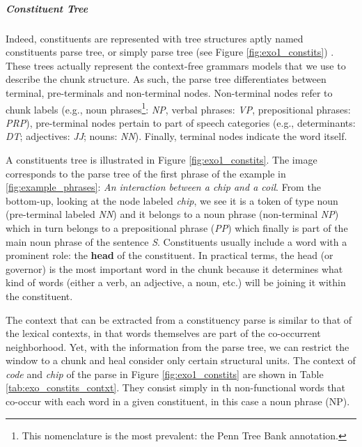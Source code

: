 \subparagraph{Constituent Tree}
Indeed, constituents are  represented with tree structures aptly named  constituents parse tree, or simply parse tree (see Figure \ref{fig:exo1_constits}) \cite{JurafskyM09}. These trees actually represent the context-free grammars models that we use to describe the chunk structure. As such, the parse tree differentiates between terminal, pre-terminals and non-terminal nodes. Non-terminal nodes refer to chunk labels (e.g., noun phrases\footnote{This nomenclature is the most prevalent: the Penn Tree Bank annotation.}: \textit{NP}, verbal phrases: \textit{VP}, prepositional phrases: \textit{PRP}), pre-terminal nodes pertain to part of speech categories (e.g., determinants: \textit{DT}; adjectives: \textit{JJ}; nouns: \textit{NN}). Finally, terminal nodes indicate the word itself. 

A constituents tree is illustrated in Figure \ref{fig:exo1_constits}. The image corresponds to the parse tree of the first phrase of the example in \ref{fig:example_phrases}: \textit{An interaction between a chip and a coil}. From the bottom-up,  looking at the node labeled \textit{chip}, we see it is a token of type noun (pre-terminal labeled \textit{NN}) and it belongs to a noun phrase (non-terminal \textit{NP}) which in turn belongs to a prepositional phrase (\textit{PP}) which finally is part of the main noun phrase of the sentence \textit{S}. Constituents usually include a word with a prominent role: the \textbf{head} of the constituent. In practical terms, the head (or governor) is the most important word in the chunk because it determines what kind of words (either a verb, an adjective, a noun, etc.) will be joining it within the constituent. 

The context that can be extracted from a constituency parse is similar to that of the lexical contexts, in that words themselves are part of the co-occurrent neighborhood. Yet, with the information from the parse tree, we can restrict the window to a chunk and heal consider only certain structural units. The context of \textit{code} and \textit{chip} of the parse  in Figure \ref{fig:exo1_constits} are shown in Table \ref{tab:exo_constits_contxt}. They consist simply in th non-functional words that co-occur with each word in a given constituent, in this case a noun phrase (NP).

